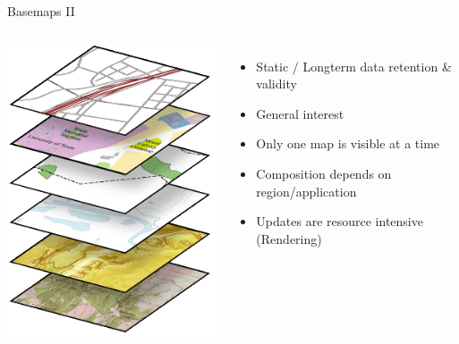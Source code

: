 \documentclass{beamer}
\begin{document}
\begin{frame}{Basemaps II}
 \begin{columns}
   \includegraphics[scale=0.5]{basemap_layers}
   \begin{itemize}
    \item Static / Longterm data retention & validity
    \item General interest
    \item Only one map is visible at a time
    \item Composition depends on region/application
    \item Updates are resource intensive (Rendering)
   \end{itemize}
 \end{columns}
\end{frame}
\end{document}
